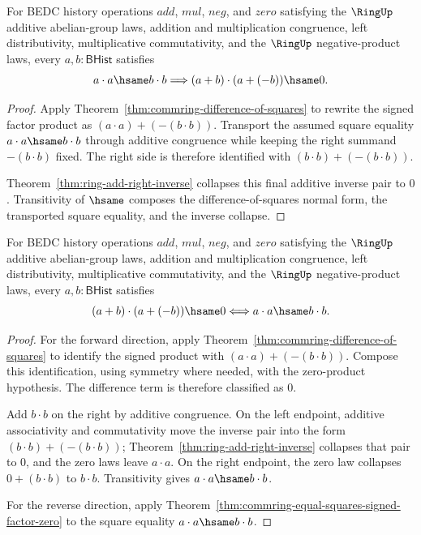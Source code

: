 \begin{theorem}
\label{thm:commring-equal-squares-signed-factor-zero}
For BEDC history operations $add$, $mul$, $neg$, and $zero$ satisfying the
$\RingUp$ additive abelian-group laws, addition and multiplication
congruence, left distributivity, multiplicative commutativity, and the
$\RingUp$ negative-product laws, every $a,b : \mathsf{BHist}$ satisfies
$$
a\cdot a\hsame b\cdot b
\Longrightarrow
(a+b)\cdot(a+(-b))\hsame0 .
$$
\end{theorem}
\begin{proof}
Apply Theorem~\ref{thm:commring-difference-of-squares}
to rewrite the signed factor product as $(a\cdot a)+(-(b\cdot b))$. Transport
the assumed square equality $a\cdot a\hsame b\cdot b$ through additive
congruence while keeping the right summand $-(b\cdot b)$ fixed. The right side
is therefore identified with $(b\cdot b)+(-(b\cdot b))$.

Theorem~\ref{thm:ring-add-right-inverse} collapses this final additive inverse
pair to $0$. Transitivity of $\hsame$ composes the difference-of-squares
normal form, the transported square equality, and the inverse collapse.
\end{proof}

\begin{theorem}
\label{thm:commring-difference-of-squares-zero-exact}
For BEDC history operations $add$, $mul$, $neg$, and $zero$ satisfying the
$\RingUp$ additive abelian-group laws, addition and multiplication
congruence, left distributivity, multiplicative commutativity, and the
$\RingUp$ negative-product laws, every $a,b : \mathsf{BHist}$ satisfies
$$
(a+b)\cdot(a+(-b))\hsame0
\Longleftrightarrow
a\cdot a\hsame b\cdot b .
$$
\end{theorem}
\begin{proof}
For the forward direction, apply Theorem~\ref{thm:commring-difference-of-squares}
to identify the signed product with $(a\cdot a)+(-(b\cdot b))$. Compose this
identification, using symmetry where needed, with the zero-product hypothesis.
The difference term is therefore classified as $0$.

Add $b\cdot b$ on the right by additive congruence. On the left endpoint,
additive associativity and commutativity move the inverse pair into the form
$(b\cdot b)+(-(b\cdot b))$; Theorem~\ref{thm:ring-add-right-inverse}
collapses that pair to $0$, and the zero laws leave $a\cdot a$. On the right
endpoint, the zero law collapses $0+(b\cdot b)$ to $b\cdot b$. Transitivity
gives $a\cdot a\hsame b\cdot b$.

For the reverse direction, apply
Theorem~\ref{thm:commring-equal-squares-signed-factor-zero} to the square
equality $a\cdot a\hsame b\cdot b$.
\end{proof}

